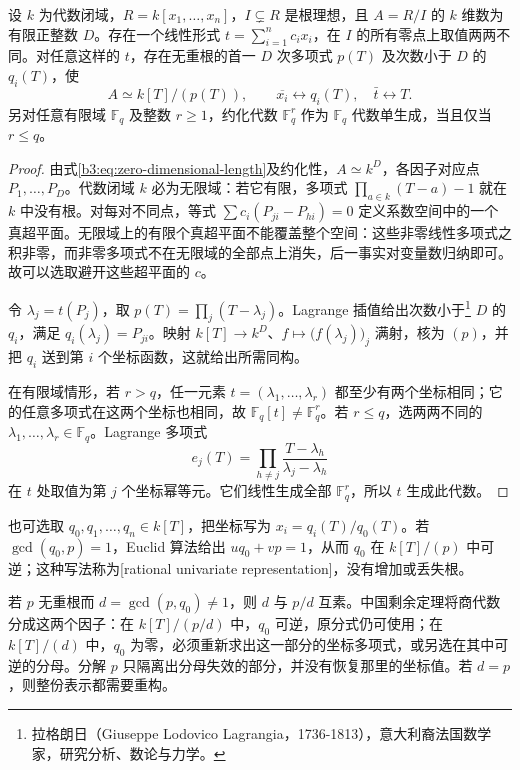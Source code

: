 \begin{proposition}\label{b3:prop:finite-reduced-shape}
	设 \(k\) 为代数闭域，\(R=k[x_1,\ldots,x_n]\)，\(I\subsetneq R\) 是根理想，且 \(A=R/I\) 的 \(k\) 维数为有限正整数 \(D\)。存在一个线性形式 \(t=\sum_{i=1}^n c_ix_i\)，在 \(I\) 的所有零点上取值两两不同。对任意这样的 \(t\)，存在无重根的首一 \(D\) 次多项式 \(p(T)\) 及次数小于 \(D\) 的 \(q_i(T)\)，使
	\[
		A\simeq k[T]/(p(T)),\qquad \overline{x_i}\longleftrightarrow q_i(T),\quad \bar t\longleftrightarrow T.
	\]
	另对任意有限域 \(\mathbb F_q\) 及整数 \(r\ge1\)，约化代数 \(\mathbb F_q^r\) 作为 \(\mathbb F_q\) 代数单生成，当且仅当 \(r\le q\)。
\end{proposition}
\begin{proof}
	由式\eqref{b3:eq:zero-dimensional-length}及约化性，\(A\simeq k^D\)，各因子对应点 \(P_1,\ldots,P_D\)。代数闭域 \(k\) 必为无限域：若它有限，多项式 \(\prod_{a\in k}(T-a)-1\) 就在 \(k\) 中没有根。对每对不同点，等式 \(\sum c_i(P_{ji}-P_{hi})=0\) 定义系数空间中的一个真超平面。无限域上的有限个真超平面不能覆盖整个空间：这些非零线性多项式之积非零，而非零多项式不在无限域的全部点上消失，后一事实对变量数归纳即可。故可以选取避开这些超平面的 \(c\)。

	令 \(\lambda_j=t(P_j)\)，取 \(p(T)=\prod_j(T-\lambda_j)\)。Lagrange 插值给出次数小于\footnote{拉格朗日（Giuseppe Lodovico Lagrangia，1736-1813），意大利裔法国数学家，研究分析、数论与力学。} \(D\) 的 \(q_i\)，满足 \(q_i(\lambda_j)=P_{ji}\)。映射 \(k[T]\to k^D\)、\(f\mapsto\bigl(f(\lambda_j)\bigr)_j\) 满射，核为 \((p)\)，并把 \(q_i\) 送到第 \(i\) 个坐标函数，这就给出所需同构。

	在有限域情形，若 \(r>q\)，任一元素 \(t=(\lambda_1,\ldots,\lambda_r)\) 都至少有两个坐标相同；它的任意多项式在这两个坐标也相同，故 \(\mathbb F_q[t]\ne\mathbb F_q^r\)。若 \(r\le q\)，选两两不同的 \(\lambda_1,\ldots,\lambda_r\in\mathbb F_q\)。Lagrange 多项式
	\[
		e_j(T)=\prod_{h\ne j}\frac{T-\lambda_h}{\lambda_j-\lambda_h}
	\]
	在 \(t\) 处取值为第 \(j\) 个坐标幂等元。它们线性生成全部 \(\mathbb F_q^r\)，所以 \(t\) 生成此代数。
\end{proof}

也可选取 \(q_0,q_1,\ldots,q_n\in k[T]\)，把坐标写为 \(x_i=q_i(T)/q_0(T)\)。若 \(\gcd(q_0,p)=1\)，Euclid 算法给出 \(uq_0+vp=1\)，从而 \(q_0\) 在 \(k[T]/(p)\) 中可逆；这种写法称为[rational univariate representation]，没有增加或丢失根。

\ProseParagraphBreak
若 \(p\) 无重根而 \(d=\gcd(p,q_0)\ne1\)，则 \(d\) 与 \(p/d\) 互素。中国剩余定理将商代数分成这两个因子：在 \(k[T]/(p/d)\) 中，\(q_0\) 可逆，原分式仍可使用；在 \(k[T]/(d)\) 中，\(q_0\) 为零，必须重新求出这一部分的坐标多项式，或另选在其中可逆的分母。分解 \(p\) 只隔离出分母失效的部分，并没有恢复那里的坐标值。若 \(d=p\)，则整份表示都需要重构。

